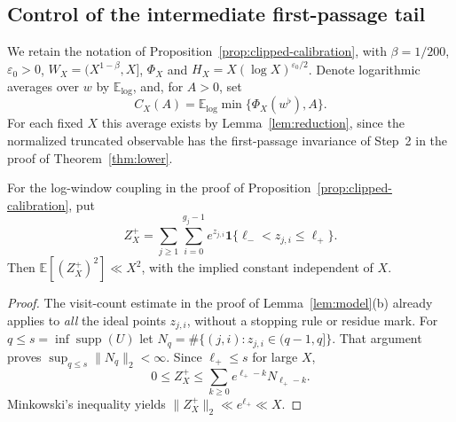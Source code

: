 \subsection*{Control of the intermediate first-passage tail}
\label{subsec:intermediate-tail}
We retain the notation of Proposition~\ref{prop:clipped-calibration},
with $\beta=1/200$, $\varepsilon_0>0$, $W_X=(X^{1-\beta},X]$,
$\Phi_X$ and $H_X=X(\log X)^{\varepsilon_0/2}$. Denote logarithmic
averages over $w$ by $\mathbb E_{\log}$, and, for $A>0$, set
\[
 C_X(A)=\mathbb E_{\log}\min\{\Phi_X(w^\flat),A\}.
\]
For each fixed $X$ this average exists by Lemma~\ref{lem:reduction},
since the normalized truncated observable has the first-passage
invariance of Step~2 in the proof of Theorem~\ref{thm:lower}.

\begin{lemma}
\label{lem:full-ideal-second-moment}
For the log-window coupling in the proof of
Proposition~\ref{prop:clipped-calibration}, put
\[
 Z_X^+=\sum_{j\ge1}\sum_{i=0}^{g_j-1}
 e^{z_{j,i}}\mathbf 1\{\ell_-<z_{j,i}\le\ell_+\}.
\]
Then $\mathbb E[(Z_X^+)^2]\ll X^2$, with the implied constant
independent of $X$.
\end{lemma}
\begin{proof}
The visit-count estimate in the proof of
Lemma~\ref{lem:model}(b) already applies to \emph{all} the
ideal points $z_{j,i}$, without a stopping rule or residue mark.
For $q\le s=\inf\operatorname{supp}(U)$ let
$N_q=\#\{(j,i):z_{j,i}\in(q-1,q]\}$.
That argument proves $\sup_{q\le s}\|N_q\|_2<\infty$.
Since $\ell_+\le s$ for large $X$,
\[
 0\le Z_X^+\le\sum_{k\ge0}e^{\ell_+-k}N_{\ell_+-k}.
\]
Minkowski's inequality yields
$\|Z_X^+\|_2\ll e^{\ell_+}\ll X$.
\end{proof}

